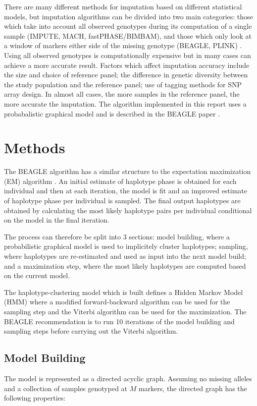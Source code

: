 \documentclass[a4paper,11pt,twoside,abstraction,titlepage]{article}
\begin{document}
There are many different methods for imputation based on different statistical models, but imputation algorithms can be divided into two main categories: those which take into account all observed genotypes during its computation of a single sample (IMPUTE, MACH, fastPHASE/BIMBAM), and those which only look at a window of markers either side of the missing genotype (BEAGLE, PLINK) \cite{review2009}.  Using all observed genotypes is computationally expensive but in many cases can achieve a more accurate result.  Factors which affect imputation accuracy include the size and choice of reference panel; the difference in genetic diversity between the study population and the reference panel; use of tagging methods for SNP array design.  In almost all cases, the more samples in the reference panel, the more accurate the imputation.  The algorithm implemented in this report uses a probabalistic graphical model and is described in the BEAGLE paper \cite{beagle3}.


\newpage
\section{Methods}
The BEAGLE algorithm has a similar structure to the expectation maximization (EM) algorithm \cite{EMalgorithm}.  An initial estimate of haplotype phase is obtained for each individual and then at each iteration, the model is fit and an improved estimate of haplotype phase per individual is sampled.  The final output haplotypes are obtained by calculating the most likely haplotype pairs per individual conditional on the model in the final iteration.

The process can therefore be split into 3 sections: model building, where a probabilistic graphical model is used to implicitely cluster haplotypes; sampling, where haplotypes are re-estimated and used as input into the next model build; and a maximization step, where the most likely haplotypes are computed based on the current model.

The haplotype-clustering model which is built defines a Hidden Markov Model (HMM) where a modified forward-backward algorithm can be used for the sampling step and the Viterbi algorithm can be used for the maximization.  The BEAGLE recommendation is to run 10 iterations of the model building and sampling steps before carrying out the Viterbi algorithm.


\subsection{Model Building}
The model is represented as a directed acyclic graph.  Assuming no missing alleles and a collection of samples genotyped at $M$ markers, the directed graph has the following properties:
\end{document}
